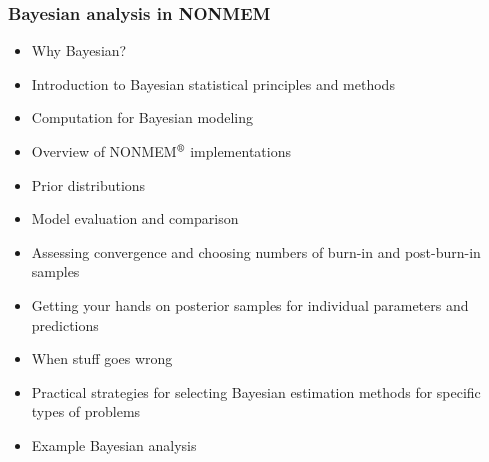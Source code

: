 \documentclass{beamer}
\begin{document}
\begin{frame}
  \frametitle{Bayesian analysis in NONMEM}
  
  \begin{itemize}
  \item<1-> Why Bayesian?
  \item<2-> Introduction to Bayesian statistical principles and methods
  \item<3-> Computation for Bayesian modeling
  \item<4-> Overview of NONMEM$^\text{\textregistered}$ implementations
  \item<5-> Prior distributions
  \item<6-> Model evaluation and comparison
  \item<7-> Assessing convergence and choosing numbers of burn-in and
    post-burn-in samples
  \item<8-> Getting your hands on posterior samples for individual
    parameters and predictions
  \item<9-> When stuff goes wrong
  \item<10-> Practical strategies for selecting Bayesian estimation methods
    for specific types of problems
  \item<11-> Example Bayesian analysis
  \end{itemize}

\end{frame}

\end{document}
